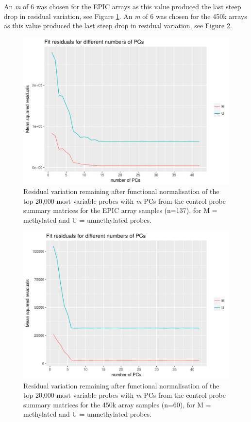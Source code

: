 \documentclass[
]{book}
\begin{document}
An \emph{m} of 6 was chosen for the EPIC arrays as this value produced the last steep drop in residual variation, see Figure \ref{fig:MAVIDOSfunnormPCsEPICMonApr162018}.
An \emph{m} of 6 was chosen for the 450k arrays as this value produced the last steep drop in residual variation, see Figure \ref{fig:MAVIDOSfunnormPCs450kMonApr162018}.

\begin{figure}

{\centering \includegraphics[width=0.8\linewidth]{figs/MAVIDOSfunnormPCsEPICMonApr162018} 

}

\caption{Residual variation remaining after functional normalisation of the top 20,000 most variable probes with \emph{m} PCs from the control probe summary matrices for the EPIC array samples (n=137), for M = methylated and U = unmethylated probes.}\label{fig:MAVIDOSfunnormPCsEPICMonApr162018}
\end{figure}



\begin{figure}

{\centering \includegraphics[width=0.8\linewidth]{figs/MAVIDOSfunnormPCs450kMonApr162018} 

}

\caption{Residual variation remaining after functional normalisation of the top 20,000 most variable probes with \emph{m} PCs from the control probe summary matrices for the 450k array samples (n=60), for M = methylated and U = unmethylated probes.}\label{fig:MAVIDOSfunnormPCs450kMonApr162018}
\end{figure}
\end{document}
